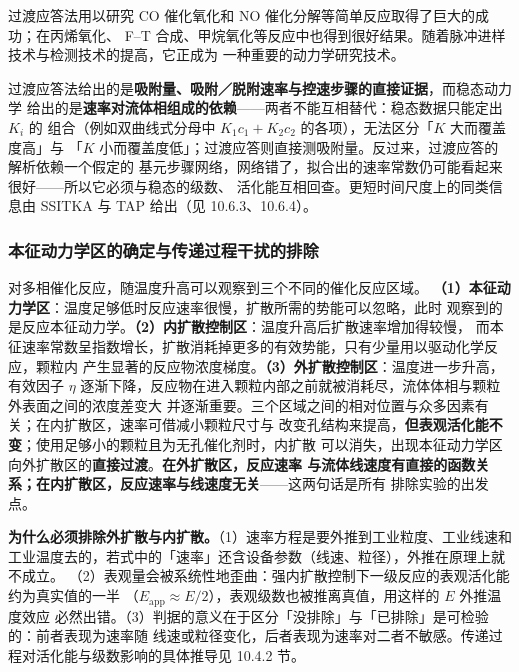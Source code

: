过渡应答法用以研究 CO 催化氧化和 NO 催化分解等简单反应取得了巨大的成功；在丙烯氧化、
F–T 合成、甲烷氧化等反应中也得到很好结果。随着脉冲进样技术与检测技术的提高，它正成为
一种重要的动力学研究技术。

\begin{crosscheck}
过渡应答法给出的是\textbf{吸附量、吸附／脱附速率与控速步骤的直接证据}，而稳态动力学
给出的是\textbf{速率对流体相组成的依赖}——两者不能互相替代：稳态数据只能定出 $K_i$ 的
组合（例如双曲线式分母中 $K_1c_1+K_2c_2$ 的各项），无法区分「$K$ 大而覆盖度高」与
「$K$ 小而覆盖度低」；过渡应答则直接测吸附量。反过来，过渡应答的解析依赖一个假定的
基元步骤网络，网络错了，拟合出的速率常数仍可能看起来很好——所以它必须与稳态的级数、
活化能互相回查。更短时间尺度上的同类信息由 SSITKA 与 TAP 给出（见 10.6.3、10.6.4）。
\end{crosscheck}

\subsubsection{本征动力学区的确定与传递过程干扰的排除}

对多相催化反应，随温度升高可以观察到三个不同的催化反应区域。
\textbf{（1）本征动力学区}：温度足够低时反应速率很慢，扩散所需的势能可以忽略，此时
观察到的是反应本征动力学。\textbf{（2）内扩散控制区}：温度升高后扩散速率增加得较慢，
而本征速率常数呈指数增长，扩散消耗掉更多的有效势能，只有少量用以驱动化学反应，颗粒内
产生显著的反应物浓度梯度。\textbf{（3）外扩散控制区}：温度进一步升高，有效因子 $\eta$
逐渐下降，反应物在进入颗粒内部之前就被消耗尽，流体体相与颗粒外表面之间的浓度差变大
并逐渐重要。三个区域之间的相对位置与众多因素有关；在内扩散区，速率可借减小颗粒尺寸与
改变孔结构来提高，\textbf{但表观活化能不变}；使用足够小的颗粒且为无孔催化剂时，内扩散
可以消失，出现本征动力学区向外扩散区的\textbf{直接过渡}。\textbf{在外扩散区，反应速率
与流体线速度有直接的函数关系；在内扩散区，反应速率与线速度无关}——这两句话是所有
排除实验的出发点。

\begin{keycond}
\textbf{为什么必须排除外扩散与内扩散。}（1）速率方程是要外推到工业粒度、工业线速和
工业温度去的，若式中的「速率」还含设备参数（线速、粒径），外推在原理上就不成立。
（2）表观量会被系统性地歪曲：强内扩散控制下一级反应的表观活化能约为真实值的一半
（$E_{\mathrm{app}}\approx E/2$），表观级数也被推离真值，用这样的 $E$ 外推温度效应
必然出错。（3）判据的意义在于区分「没排除」与「已排除」是可检验的：前者表现为速率随
线速或粒径变化，后者表现为速率对二者不敏感。传递过程对活化能与级数影响的具体推导见
10.4.2 节。
\end{keycond}

